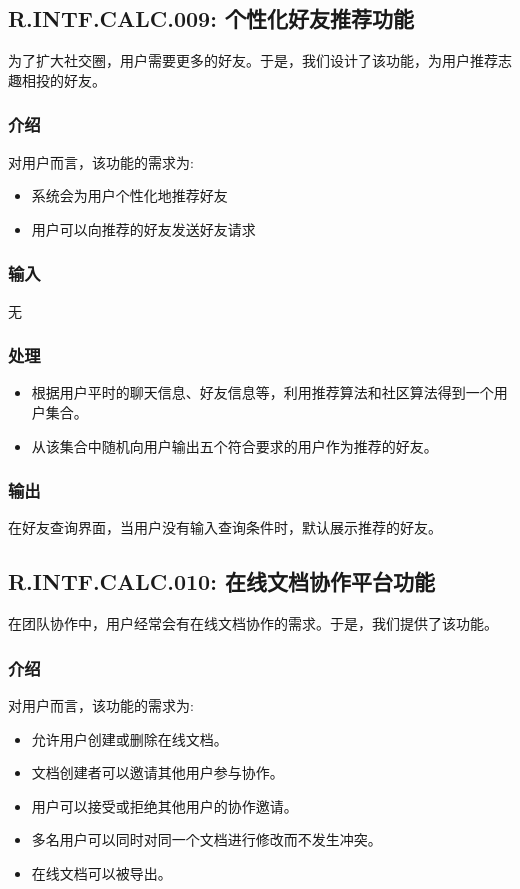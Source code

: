 \subsection{R.INTF.CALC.009: 个性化好友推荐功能}
为了扩大社交圈，用户需要更多的好友。于是，我们设计了该功能，为用户推荐志趣相投的好友。
\subsubsection{介绍}
对用户而言，该功能的需求为:
\begin{itemize}
  \item 系统会为用户个性化地推荐好友
  \item 用户可以向推荐的好友发送好友请求
\end{itemize}
\subsubsection{输入}
无
\subsubsection{处理}
\begin{itemize}
  \item 根据用户平时的聊天信息、好友信息等，利用推荐算法和社区算法得到一个用户集合。
  \item 从该集合中随机向用户输出五个符合要求的用户作为推荐的好友。
\end{itemize}
\subsubsection{输出}
在好友查询界面，当用户没有输入查询条件时，默认展示推荐的好友。

\subsection{R.INTF.CALC.010: 在线文档协作平台功能}
在团队协作中，用户经常会有在线文档协作的需求。于是，我们提供了该功能。
\subsubsection{介绍}
对用户而言，该功能的需求为:
\begin{itemize}
  \item 允许用户创建或删除在线文档。
  \item 文档创建者可以邀请其他用户参与协作。
  \item 用户可以接受或拒绝其他用户的协作邀请。
  \item 多名用户可以同时对同一个文档进行修改而不发生冲突。
  \item 在线文档可以被导出。
\end{itemize}
